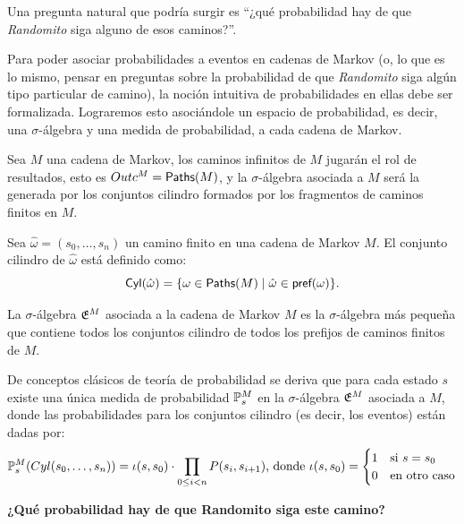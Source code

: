 Una pregunta natural que podría surgir es ``¿qué probabilidad hay de que
\emph{Randomito} siga alguno de esos caminos?''.

Para poder asociar probabilidades a eventos en cadenas de Markov (o, lo que es
lo mismo, pensar en preguntas sobre la probabilidad de que \emph{Randomito}
siga algún tipo particular de camino), la noción intuitiva de probabilidades en
ellas debe ser formalizada. Lograremos esto asociándole un espacio de
probabilidad, es decir, una $\sigma$-álgebra y una medida de probabilidad, a
cada cadena de Markov.

Sea $M$ una cadena de Markov, los caminos infinitos de $M$ jugarán el rol de
resultados, esto es $Outc^M = \textsf{Paths}(M)$, y la $\sigma$-álgebra asociada a $M$
será la generada por los conjuntos cilindro formados por los fragmentos de
caminos finitos en $M$.

\begin{definition}
	Sea $\hat \omega = (s_0, \dots, s_n)$ un camino finito en una cadena de Markov
	$M$. El conjunto cilindro de $\hat \omega$ está definido como: $$\textsf{Cyl}(\hat
		\omega) = \{\omega \in \textsf{Paths}(M) \mid \hat \omega \in \textsf{pref}(\omega)\}.$$
\end{definition}

\begin{definition}
	La $\sigma$-álgebra $\mathfrak{E}^M$ asociada a la cadena de Markov $M$ es la $\sigma$-álgebra más pequeña que contiene todos los conjuntos cilindro de todos los prefijos de caminos finitos de $M$.
\end{definition}

De conceptos clásicos de teoría de probabilidad se deriva que para cada estado
$s$ existe una única medida de probabilidad $\mathbb{P}^M_{s}$ en la
$\sigma$-álgebra $\mathfrak{E}^M$ asociada a $M$, donde las probabilidades para los
conjuntos cilindro (es decir, los eventos) están dadas por:
\begin{equation}
	\label{probMC}
	\mathbb{P}^M_{s}(Cyl(s_0, \dots, s_n)) = \iota(s,s_0) \cdot \prod_{0 \leq i < n} P(s_i, s_{i+1})\text{, donde }\iota(s,s_0) =
	\begin{cases}
		1 &\text{si } s = s_0 \\
		0 &\text{en otro caso}
	\end{cases}
\end{equation}

\textbf{¿Qué probabilidad hay de que Randomito siga este camino?}

